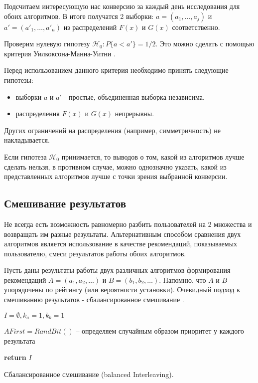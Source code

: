 \documentclass[12pt,a4paper]{report}
\begin{document}
Подсчитаем интересующую нас конверсию за каждый день исследования для обоих алгоритмов. В итоге получатся 2 выборки: $a = (a_1, \dots, a_j)$ и $a' = (a'_1, \dots, a'_n)$ из распределений $F(x)$ и $G(x)$ соответственно.

Проверим нулевую гипотезу $\mathcal{H}_0: \textit{P}\{a < a'\} = 1/2$. Это можно сделать с помощью критерия Уилкоксона-Манна-Уитни \cite{Mw}.

Перед использованием данного критерия необходимо принять следующие гипотезы:
\begin{itemize}
\item выборки $a$ и $a'$ - простые, объединенная выборка независима.
\item распределения $F(x)$ и $G(x)$ непрерывны.
\end{itemize}
Других ограничений на распределения (например, симметричность) не накладывается.

Если гипотеза $\mathcal{H}_0$ принимается, то выводов о том, какой из алгоритмов лучше сделать нельзя, в противном случае, можно однозначно указать, какой из представленных алгоритмов лучше с точки зрения выбранной конверсии.

\subsection{Смешивание результатов}

Не всегда есть возможность равномерно разбить пользователей на 2 множества и возвращать им разные результаты. Альтернативным способом сравнения двух алгоритмов является использование в качестве рекомендаций, показываемых пользователю, смеси результатов работы обоих алгоритмов.

Пусть даны результаты работы двух различных алгоритмов формирования рекомендаций $A = (a_1, a_2, \dots)$ и $B = (b_1, b_2, \dots)$. Напомню, что $A$ и $B$ упорядочены по рейтингу (или вероятности установки). Очевидный подход к смешиванию результатов - сбалансированное смешивание \cite{In}.

\begin{algorithm}[H]
\SetAlgoLined
{}
$I = \emptyset, k_a = 1, k_b = 1$

$AFirst = RandBit()$ -- определяем случайным образом приоритет у каждого результата

\textbf{return} $I$
\caption{Сбалансированное смешивание (balanced Interleaving).}
\label{alg:BI}
\end{algorithm}
\end{document}
